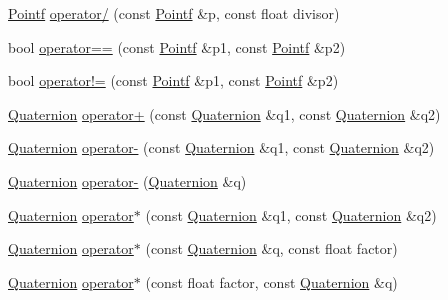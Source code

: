 \begin{DoxyCompactItemize}
\item 
\hyperlink{classprism_1_1geometry_1_1_pointf}{Pointf} \hyperlink{namespaceprism_1_1geometry_a92840138c9489a1289e4bc62260c8688}{operator/} (const \hyperlink{classprism_1_1geometry_1_1_pointf}{Pointf} \&p, const float divisor)
\item 
bool \hyperlink{namespaceprism_1_1geometry_ac04261b226cf18be37becdd7dd3e4614}{operator==} (const \hyperlink{classprism_1_1geometry_1_1_pointf}{Pointf} \&p1, const \hyperlink{classprism_1_1geometry_1_1_pointf}{Pointf} \&p2)
\item 
bool \hyperlink{namespaceprism_1_1geometry_aab1eafe7676f511287407189ece847c8}{operator!=} (const \hyperlink{classprism_1_1geometry_1_1_pointf}{Pointf} \&p1, const \hyperlink{classprism_1_1geometry_1_1_pointf}{Pointf} \&p2)
\item 
\hyperlink{classprism_1_1geometry_1_1_quaternion}{Quaternion} \hyperlink{namespaceprism_1_1geometry_a47ca3e65ed51c70eed1343fc1b8738ae}{operator+} (const \hyperlink{classprism_1_1geometry_1_1_quaternion}{Quaternion} \&q1, const \hyperlink{classprism_1_1geometry_1_1_quaternion}{Quaternion} \&q2)
\item 
\hyperlink{classprism_1_1geometry_1_1_quaternion}{Quaternion} \hyperlink{namespaceprism_1_1geometry_a47b430d42b2e7721f63c1cdd24d3971c}{operator-\/} (const \hyperlink{classprism_1_1geometry_1_1_quaternion}{Quaternion} \&q1, const \hyperlink{classprism_1_1geometry_1_1_quaternion}{Quaternion} \&q2)
\item 
\hyperlink{classprism_1_1geometry_1_1_quaternion}{Quaternion} \hyperlink{namespaceprism_1_1geometry_a0a3b3454cd9d95c78cd8a488593d34ce}{operator-\/} (\hyperlink{classprism_1_1geometry_1_1_quaternion}{Quaternion} \&q)
\item 
\hyperlink{classprism_1_1geometry_1_1_quaternion}{Quaternion} \hyperlink{namespaceprism_1_1geometry_a2ce6e5fb2b4e43c6eceebf44965fca53}{operator$\ast$} (const \hyperlink{classprism_1_1geometry_1_1_quaternion}{Quaternion} \&q1, const \hyperlink{classprism_1_1geometry_1_1_quaternion}{Quaternion} \&q2)
\item 
\hyperlink{classprism_1_1geometry_1_1_quaternion}{Quaternion} \hyperlink{namespaceprism_1_1geometry_a2fcdc12a9980dab1f3ba9d984aa8de3a}{operator$\ast$} (const \hyperlink{classprism_1_1geometry_1_1_quaternion}{Quaternion} \&q, const float factor)
\item 
\hyperlink{classprism_1_1geometry_1_1_quaternion}{Quaternion} \hyperlink{namespaceprism_1_1geometry_abbdf9ffa77d2b8e0b2cfe8344685c622}{operator$\ast$} (const float factor, const \hyperlink{classprism_1_1geometry_1_1_quaternion}{Quaternion} \&q)

\end{DoxyCompactItemize}
